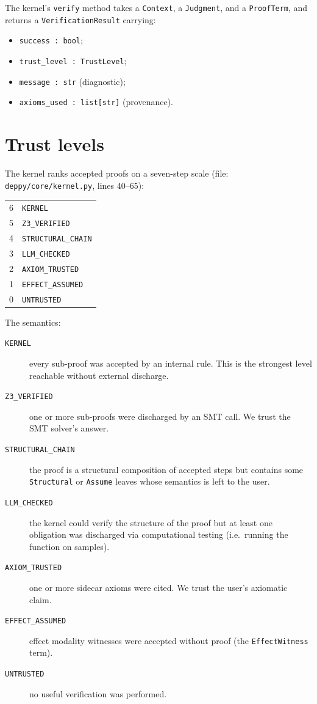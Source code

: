The kernel's \texttt{verify} method takes a \texttt{Context}, a
\texttt{Judgment}, and a \texttt{ProofTerm}, and returns a
\texttt{VerificationResult} carrying:
\begin{itemize}[leftmargin=1.7em]
  \item \texttt{success : bool};
  \item \texttt{trust\_level : TrustLevel};
  \item \texttt{message : str} (diagnostic);
  \item \texttt{axioms\_used : list[str]} (provenance).
\end{itemize}

\section{Trust levels}
\label{sec:trust-levels}

The kernel ranks accepted proofs on a seven-step scale (file:
\texttt{deppy/core/kernel.py}, lines 40--65):

\begin{center}
\begin{tabular}{rl}
\toprule
6 & \texttt{KERNEL}            \\
5 & \texttt{Z3\_VERIFIED}      \\
4 & \texttt{STRUCTURAL\_CHAIN} \\
3 & \texttt{LLM\_CHECKED}      \\
2 & \texttt{AXIOM\_TRUSTED}    \\
1 & \texttt{EFFECT\_ASSUMED}   \\
0 & \texttt{UNTRUSTED}         \\
\bottomrule
\end{tabular}
\end{center}

The semantics:
\begin{description}
  \item[\texttt{KERNEL}] every sub-proof was accepted by an internal
    rule.  This is the strongest level reachable without external
    discharge.
  \item[\texttt{Z3\_VERIFIED}] one or more sub-proofs were
    discharged by an SMT call.  We trust the SMT solver's answer.
  \item[\texttt{STRUCTURAL\_CHAIN}] the proof is a structural
    composition of accepted steps but contains some \texttt{Structural}
    or \texttt{Assume} leaves whose semantics is left to the user.
  \item[\texttt{LLM\_CHECKED}] the kernel could verify the structure
    of the proof but at least one obligation was discharged via
    computational testing (i.e.\ running the function on samples).
  \item[\texttt{AXIOM\_TRUSTED}] one or more sidecar axioms were
    cited.  We trust the user's axiomatic claim.
  \item[\texttt{EFFECT\_ASSUMED}] effect modality witnesses were
    accepted without proof (the \texttt{EffectWitness} term).
  \item[\texttt{UNTRUSTED}] no useful verification was performed.
\end{description}

